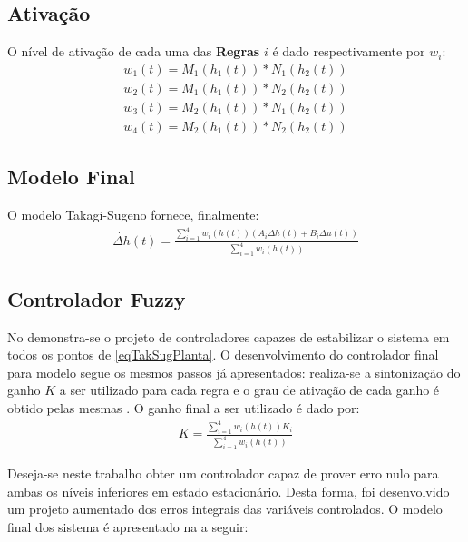 \subsection{Ativação}
O nível de ativação de cada uma das \textbf{Regras} $i$ é dado respectivamente por $w_i$:
	\begin{equation}
	\begin{aligned}
		w_{1}(t) = M_1(h_1(t)) * N_1(h_2(t)) \\
		w_{2}(t) = M_1(h_1(t)) * N_2(h_2(t)) \\
		w_{3}(t) = M_2(h_1(t)) * N_1(h_2(t)) \\
		w_{4}(t) = M_2(h_1(t)) * N_2(h_2(t))
	\end{aligned}
	\label{eqGrauAtiv4T}
	\end{equation}
	
\subsection{Modelo Final}
O modelo Takagi-Sugeno fornece, finalmente:
	\begin{align} \label{eqTakSugPlanta}
		\dot{\Delta h}(t) = \frac{\sum_{i=1}^{4}  w_i(h(t))(A_i \Delta h(t) +  B_i \Delta u(t))}{\sum_{i=1}^{4} w_i(h(t))}
	\end{align}

\subsection{Controlador Fuzzy}
No  demonstra-se o projeto de controladores capazes de estabilizar o sistema em todos os pontos de \ref{eqTakSugPlanta}. O desenvolvimento do controlador final para modelo segue os mesmos passos já apresentados: realiza-se a sintonização do ganho $K$ a ser utilizado para cada regra e o grau de ativação de cada ganho é obtido pelas mesmas .
 O ganho final a ser utilizado é dado por:
	\begin{align} \label{eqModContFuzzy}
		K = \frac{\sum_{i=1}^{4}  w_i(h(t))K_i}{\sum_{i=1}^{4} w_i(h(t))}
	\end{align}

Deseja-se neste trabalho obter um controlador capaz de prover erro nulo para ambas os níveis inferiores em estado estacionário. Desta forma, foi desenvolvido um projeto aumentado dos erros integrais das variáveis controlados. O modelo final dos sistema é apresentado na  a seguir:

